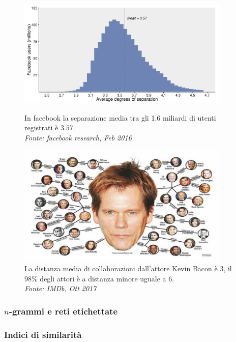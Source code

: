 \begin{frame}
	\begin{figure}[h]
		\centering
		\begin{minipage}[t]{.49\textwidth}
			\centering
			\includegraphics[width=0.9\textwidth]{images/facebook}
			\caption{In facebook la separazione media tra gli 1.6 miliardi di utenti registrati è $3.57$.\\ \textit{Fonte: facebook research, Feb 2016}}
		\end{minipage}\hfill
		\begin{minipage}[t]{.49\textwidth}
			\centering
			\includegraphics[width=0.9\textwidth]{images/2_kevin_bacon}
			\caption{La distanza media di collaborazioni dall'attore Kevin Bacon è $3$, il $98\%$ degli attori è a distanza minore uguale a $6$.\\ \textit{Fonte: IMDb, Ott 2017}}
		\end{minipage}
	\end{figure}
	
\end{frame}

\begin{frame}
	\frametitle{$n$-grammi e reti etichettate}
	\centering
\end{frame}

\begin{frame}
	\frametitle{Indici di similarità}
	\centering
\end{frame}


